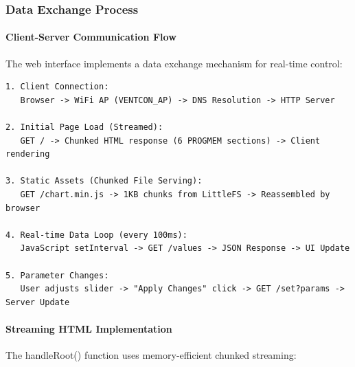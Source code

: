 \subsubsection{Data Exchange Process}

\paragraph{Client-Server Communication Flow}
The web interface implements a data exchange mechanism for real-time control:

\begin{lstlisting}[caption=Data Exchange Sequence]
1. Client Connection:
   Browser -> WiFi AP (VENTCON_AP) -> DNS Resolution -> HTTP Server

2. Initial Page Load (Streamed):
   GET / -> Chunked HTML response (6 PROGMEM sections) -> Client rendering

3. Static Assets (Chunked File Serving):
   GET /chart.min.js -> 1KB chunks from LittleFS -> Reassembled by browser

4. Real-time Data Loop (every 100ms):
   JavaScript setInterval -> GET /values -> JSON Response -> UI Update

5. Parameter Changes:
   User adjusts slider -> "Apply Changes" click -> GET /set?params -> Server Update
\end{lstlisting}

\paragraph{Streaming HTML Implementation}
The handleRoot() function uses memory-efficient chunked streaming:

